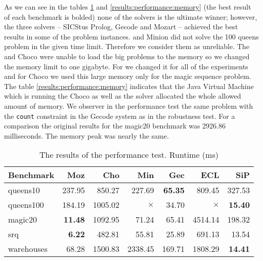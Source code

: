 As we can see in the tables \ref{results:performance:runtime} and \ref{results:performance:memory} (the best result of each benchmark is bolded) none 
of the solvers is the ultimate winner; however, the three solvers -- SICStus Prolog, Gecode and 
Mozart -- achieved the best results in some of the problem instances. \eclipse and
Minion did not solve the 100 queens problem in the given time limit. Therefore we 
consider them as unreliable. The \eclipse and Choco were unable to load the big problems
to the memory so we changed the memory limit to one gigabyte. For \eclipse we changed it for all of the
experiments and for Choco we used this large memory only for the magic sequence problem.
The table \ref{results:performance:memory} indicates that the Java Virtual Machine which
is running the Choco as well as the \eclipse solver allocated the whole allowed
amount of memory. We observer in the performance test the same problem with the \texttt{count}
constraint in the Gecode system as in the robustness test. For a comparison the original
results for the magic20 benchmark was 2926.86 milliseconds. The memory peak was nearly the same.

\begin{table}
\caption{\label{results:performance:runtime}The results of the performance test. Runtime (ms)}
\begin{center}
\begin{tabular}{lrrrrrr}
\hline Benchmark & Moz & Cho & Min & Gec & ECL & SiP \\
\hline queens10 & 237.95 & 850.27 & 227.69 & {\bf 65.35} & 809.45 & 327.53 \\
	queens100 & 184.19 & 1005.02 & $\times$ & 34.70 & $\times$ & {\bf 15.40} \\
	magic20 & {\bf 11.48} & 1092.95 & 71.24 & 65.41 & 4514.14 & 198.32 \\
	srq & {\bf 6.22} & 482.81 & 55.81 & 25.89 & 691.13 & 13.54 \\
	warehouses & 68.28 & 1500.83 & 2338.45 & 169.71 & 1808.29 & {\bf 14.41} \\  
\hline 
\end{tabular}
\end{center}
\end{table}

